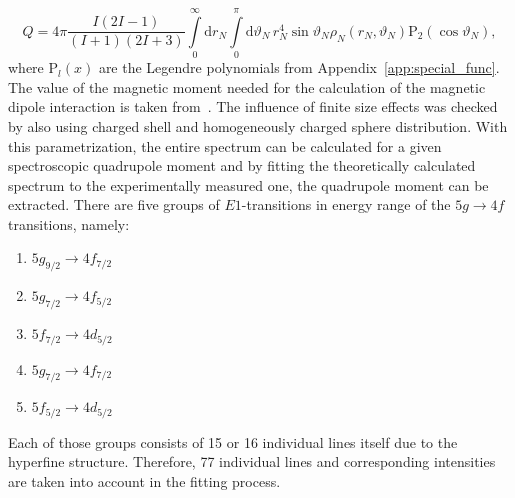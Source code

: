 \begin{equation}
Q = 4\pi\frac{I(2I-1)}{(I+1)(2I+3)}\int\limits_0^\infty\text{d}r_N \int\limits_0^\pi\text{d}\vartheta_N\,
r_N^4 \sin\vartheta_N \rho_N(r_N,\vartheta_N)\text{P}_2(\cos\vartheta_N),
\end{equation}
where $\text{P}_l(x)$ are the Legendre polynomials from Appendix~\ref{app:special_func}.
The value of the magnetic moment needed for the calculation of the magnetic dipole interaction is taken from~\cite{STONE2016}. The influence of finite size effects was checked by also using charged shell and homogeneously charged sphere distribution.
With this parametrization, the entire spectrum can be calculated for a given spectroscopic quadrupole moment and by fitting the theoretically calculated spectrum to the experimentally measured one, the quadrupole moment can be extracted. There are five groups of $E1$-transitions in energy range of the $5g\rightarrow 4f$ transitions, namely:
\begin{enumerate}
\label{en:groups}
\item $5g_{9/2}\rightarrow 4f_{7/2}$
\item $5g_{7/2}\rightarrow 4f_{5/2}$
\item $5f_{7/2}\rightarrow 4d_{5/2}$
\item $5g_{7/2}\rightarrow 4f_{7/2}$
\item $5f_{5/2}\rightarrow 4d_{5/2}$
\end{enumerate}
Each of those groups consists of 15 or 16 individual lines itself due to the hyperfine structure. Therefore, 77 individual lines and corresponding intensities are taken into account in the fitting process.

